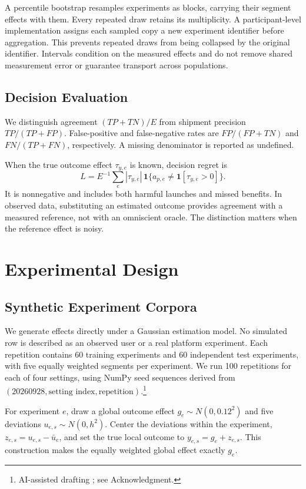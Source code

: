 \documentclass{ieeeaccess}
\newcommand{\ind}{\mathbf{1}}
\begin{document}
A percentile bootstrap resamples experiments as blocks, carrying their segment effects with them. Every repeated draw retains its multiplicity. A participant-level implementation assigns each sampled copy a new experiment identifier before aggregation. This prevents repeated draws from being collapsed by the original identifier. Intervals condition on the measured effects and do not remove shared measurement error or guarantee transport across populations.

\subsection{Decision Evaluation}
We distinguish agreement $(TP+TN)/E$ from shipment precision $TP/(TP+FP)$. False-positive and false-negative rates are $FP/(FP+TN)$ and $FN/(TP+FN)$, respectively. A missing denominator is reported as undefined.

When the true outcome effect $\tau_{y,e}$ is known, decision regret is
\begin{equation}
 L=E^{-1}\sum_e |\tau_{y,e}|\,
 \ind\{a_{p,e}\ne\ind[\tau_{y,e}>0]\}.
\end{equation}
It is nonnegative and includes both harmful launches and missed benefits. In observed data, substituting an estimated outcome provides agreement with a measured reference, not with an omniscient oracle. The distinction matters when the reference effect is noisy.

\section{Experimental Design}
\subsection{Synthetic Experiment Corpora}
We generate effects directly under a Gaussian estimation model. No simulated row is described as an observed user or a real platform experiment. Each repetition contains 60 training experiments and 60 independent test experiments, with five equally weighted segments per experiment. We run 100 repetitions for each of four settings, using NumPy seed sequences derived from $(20260928,\text{setting index},\text{repetition})$.\footnote{AI-assisted drafting \cite{codex}; see Acknowledgment.}

For experiment $e$, draw a global outcome effect $g_e\sim N(0,0.12^2)$ and five deviations $u_{e,s}\sim N(0,h^2)$. Center the deviations within the experiment, $z_{e,s}=u_{e,s}-\bar u_e$, and set the true local outcome to $y_{e,s}=g_e+z_{e,s}$. This construction makes the equally weighted global effect exactly $g_e$.
\end{document}
